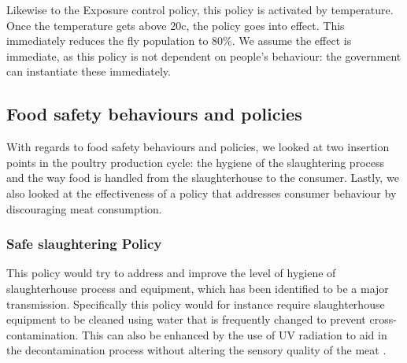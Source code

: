 Likewise to the Exposure control policy, this policy is activated by temperature. Once the temperature gets above 20\degree c, the policy goes into effect. This immediately reduces the fly population to 80\%. We assume the effect is immediate, as this policy is not dependent on people's behaviour: the government can instantiate these immediately.

\subsection{Food safety behaviours and policies}
\label{s:foodbehaviour}
With regards to food safety behaviours and policies, we looked at two insertion points in the poultry production cycle: the hygiene of the slaughtering process and the way food is handled from the slaughterhouse to the consumer. Lastly, we also looked at the effectiveness of a policy that addresses consumer behaviour by discouraging meat consumption.

\subsubsection{Safe slaughtering Policy}
This policy would try to address and improve the level of hygiene of slaughterhouse process and equipment, which has been identified to be a major transmission. Specifically this policy would for instance require slaughterhouse equipment to be cleaned using water that is frequently changed to prevent cross-contamination. This can also be enhanced by the use of UV radiation to aid in the decontamination process without altering the sensory quality of the meat \parencite{isohanni_use_2009}.

